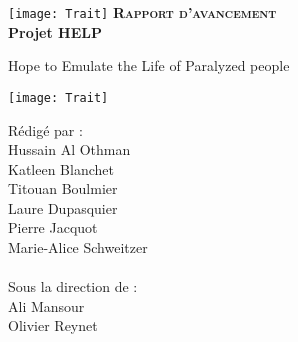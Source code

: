 \begingroup
\thispagestyle{empty}
\begin{center}
\vspace*{5.5cm}
\texttt{[image: Trait]}
{\Huge \textsc{\textbf{Rapport d'avancement}}}\\
\vspace*{1cm}
{\Huge \textbf{Projet HELP}}\par %
\vspace*{1cm}
{\huge Hope to Emulate the Life of Paralyzed people}\par %
\texttt{[image: Trait]}
\end{center}
\vspace*{2cm}

\begin{multicols}{2}
{\setlength{\baselineskip}{1.5\baselineskip}
{\Large Rédigé par :\\
Hussain Al Othman\\
Katleen Blanchet\\
Titouan Boulmier\\
Laure Dupasquier\\
Pierre Jacquot\\
Marie-Alice Schweitzer\\
\columnbreak\\
\hspace*{1cm}
Sous la direction de :\\
\hspace*{1cm}
Ali Mansour\\
\hspace*{1cm}
Olivier Reynet\\}
\par}
\end{multicols}


\endgroup
